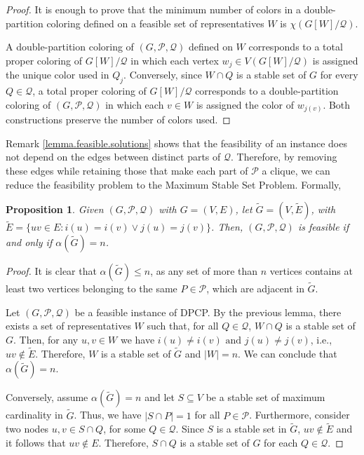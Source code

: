 \documentclass[preprint, 11pt, authoryear]{elsarticle}
\newtheorem{proposition}{Proposition}[section]
\newcommand{\PP}{{\mathcal P}}
\newcommand{\QQ}{{\mathcal Q}}
\newcommand{\card}[1]{\left| #1 \right|}
\newcommand{\cn}[1]{\chi(#1)}
\begin{document}
\begin{proof}
It is enough to prove that the minimum number of colors in a double-partition coloring defined on a feasible set of representatives $W$ is $\cn{G[W]/\QQ}$. 

A double-partition coloring of $(G, \PP, \QQ)$ defined on $W$ corresponds to a total proper coloring of $G[W]/\QQ$ in which each vertex $w_j \in V(G[W]/\QQ)$ is assigned the unique color used in $Q_j$. 
Conversely, since $W\cap Q$ is a stable set of $G$ for every $Q\in \QQ$, a total proper coloring of $G[W]/\QQ$ corresponds to a double-partition coloring of $(G, \PP, \QQ)$ in which each $v \in W$ is assigned the color of $w_{j(v)}$. 
Both constructions preserve the number of colors used.
\end{proof}




Remark \ref{lemma.feasible.solutions} shows that the feasibility of an instance does not depend on the edges between distinct parts of $\QQ$. 
Therefore, by removing these edges while retaining those that make each part of $\PP$ a clique, we can reduce the feasibility problem to the Maximum Stable Set Problem. Formally,

\begin{proposition}\label{Gtilde} Given  $(G,\PP,\QQ)$ with $G=(V,E)$, let $\tilde{G}=(V,\tilde{E})$, with 
$\tilde{E} = \{uv \in E: i(u) = i(v) \vee j(u) = j(v)\}$.
Then, $(G,\PP,\QQ)$ is feasible if and only if $\alpha(\tilde{G})= n$.
\end{proposition}

\begin{proof}
It is clear that $\alpha(\tilde G)\leq n$, as any set of more than $n$ vertices contains at least two vertices belonging to the same $P\in \PP$, which are adjacent in $\tilde{G}$.

Let $(G, \PP, \QQ)$ be a feasible instance of DPCP. By the previous lemma, there exists a set of representatives $W$ such that, for all $Q \in \QQ$, $W \cap Q$ is a stable set of $G$. Then, for any $u, v \in W$ we have $i(u)\neq i(v) \text{ and } j(u)\neq j(v)$, i.e., $uv \notin \tilde{E}$. Therefore, $W$ is a stable set of $\tilde{G}$ and $\card{W} = n$. We can conclude that $\alpha(\tilde{G}) = n$.

Conversely, assume $\alpha(\tilde{G}) = n$ and let $S \subseteq V$ be a stable set of maximum cardinality in $\tilde{G}$. Thus, we have $\card{S \cap P} = 1$ for all $P \in \PP$.
Furthermore, consider two nodes  $u, v \in S \cap Q$, for some $Q\in \QQ$. Since $S$ is a stable set in $\tilde{G}$, $uv \notin \tilde{E}$ and it follows that $uv \notin E$. Therefore, $S \cap Q$ is a stable set of $G$ for each $Q \in \QQ$.
\end{proof}
\end{document}
